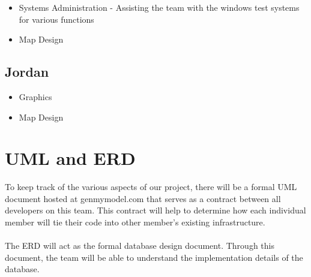 \documentclass[12pt, a4paper, oneside]{article}
\begin{document}
\begin{itemize}
  \item Systems Administration - Assisting the team with the windows test systems for various functions
  \item Map Design
\end{itemize}

\subsection*{Jordan}

\begin{itemize}
  \item Graphics
  \item Map Design
\end{itemize}

\section*{UML and ERD}
To keep track of the various aspects of our project, there will be a formal UML document hosted at genmymodel.com that serves as a contract between all developers on this team. This contract will help to determine how each individual member will tie their code into other member's existing infrastructure. \\\\
The ERD will act as the formal database design document. Through this document, the team will be able to understand the implementation details of the database. 
\end{document}
